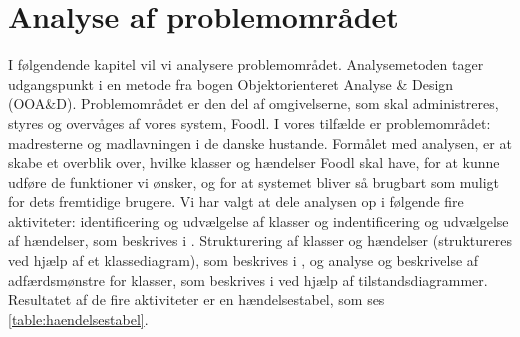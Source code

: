 \chapter{Analyse af problemområdet}
\label{chap:analyseafpo}

I følgendende kapitel vil vi analysere problemområdet. Analysemetoden tager udgangspunkt i en metode fra bogen Objektorienteret Analyse \& Design (OOA\&D)\cite[s. ~43]{ooad}. Problemområdet er den del af omgivelserne, som skal administreres, styres og overvåges af vores system, Foodl. I vores tilfælde er problemområdet: madresterne og madlavningen i de danske hustande. Formålet med analysen, er at skabe et overblik over, hvilke klasser og hændelser Foodl skal have, for at kunne udføre de funktioner vi ønsker, og for at systemet bliver så brugbart som muligt for dets fremtidige brugere. Vi har valgt at dele analysen op i følgende fire aktiviteter: identificering og udvælgelse af klasser og indentificering og udvælgelse af hændelser, som beskrives i . Strukturering af klasser og hændelser (struktureres ved hjælp af et klassediagram), som beskrives i , og analyse og beskrivelse af adfærdsmønstre for klasser, som beskrives i  ved hjælp af tilstandsdiagrammer. Resultatet af de fire aktiviteter er en hændelsestabel, som ses \ref{table:haendelsestabel}.

 
            
 
       

